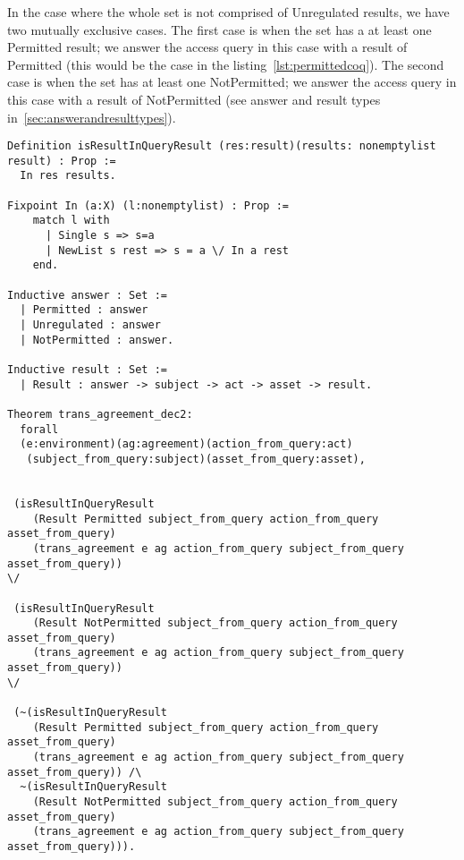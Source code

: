 In the case where the whole set is not comprised of Unregulated results, we have two mutually exclusive cases. The first case is when the set has a at least one Permitted result; we answer the access query in this case with a result of Permitted (this would be the case in the listing~\ref{lst:permittedcoq}). The second case is when the set has at least one NotPermitted; we answer the access query in this case with a result of NotPermitted (see answer and result types in~\ref{sec:answerandresulttypes}).


\begin{lstlisting}
Definition isResultInQueryResult (res:result)(results: nonemptylist result) : Prop :=
  In res results.

Fixpoint In (a:X) (l:nonemptylist) : Prop :=
    match l with
      | Single s => s=a
      | NewList s rest => s = a \/ In a rest
    end.

Inductive answer : Set :=
  | Permitted : answer
  | Unregulated : answer
  | NotPermitted : answer.

Inductive result : Set :=
  | Result : answer -> subject -> act -> asset -> result.

Theorem trans_agreement_dec2:
  forall
  (e:environment)(ag:agreement)(action_from_query:act)
   (subject_from_query:subject)(asset_from_query:asset),


 (isResultInQueryResult 
    (Result Permitted subject_from_query action_from_query asset_from_query)
    (trans_agreement e ag action_from_query subject_from_query asset_from_query)) 
\/

 (isResultInQueryResult 
    (Result NotPermitted subject_from_query action_from_query asset_from_query)
    (trans_agreement e ag action_from_query subject_from_query asset_from_query))
\/

 (~(isResultInQueryResult 
    (Result Permitted subject_from_query action_from_query asset_from_query)
    (trans_agreement e ag action_from_query subject_from_query asset_from_query)) /\
  ~(isResultInQueryResult 
    (Result NotPermitted subject_from_query action_from_query asset_from_query)
    (trans_agreement e ag action_from_query subject_from_query asset_from_query))).

\end{lstlisting}

